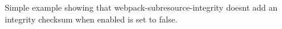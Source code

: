 Simple example showing that webpack-\/subresource-\/integrity doesn\textquotesingle{}t add an integrity checksum when {\ttfamily enabled} is set to {\ttfamily false}. 